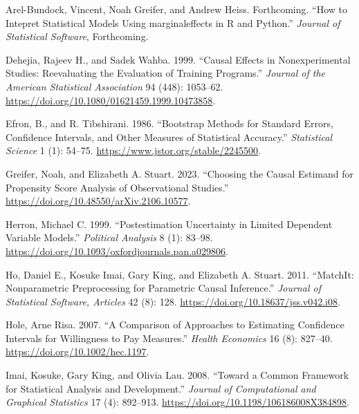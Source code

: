 \hypertarget{refs}{}
\begin{CSLReferences}{1}{0}
\leavevmode{}%
Arel-Bundock, Vincent, Noah Greifer, and Andrew Heiss. Forthcoming. {``How to Intepret Statistical Models Using {marginaleffects} in {R} and {Python}.''} \emph{Journal of Statistical Software}, Forthcoming.

\leavevmode{}%
Dehejia, Rajeev H., and Sadek Wahba. 1999. {``Causal Effects in Nonexperimental Studies: Reevaluating the Evaluation of Training Programs.''} \emph{Journal of the American Statistical Association} 94 (448): 1053--62. \url{https://doi.org/10.1080/01621459.1999.10473858}.

\leavevmode{}%
Efron, B., and R. Tibshirani. 1986. {``Bootstrap Methods for Standard Errors, Confidence Intervals, and Other Measures of Statistical Accuracy.''} \emph{Statistical Science} 1 (1): 54--75. \url{https://www.jstor.org/stable/2245500}.

\leavevmode{}%
Greifer, Noah, and Elizabeth A. Stuart. 2023. {``Choosing the Causal Estimand for Propensity Score Analysis of Observational Studies.''} \url{https://doi.org/10.48550/arXiv.2106.10577}.

\leavevmode{}%
Herron, Michael C. 1999. {``Postestimation Uncertainty in Limited Dependent Variable Models.''} \emph{Political Analysis} 8 (1): 83--98. \url{https://doi.org/10.1093/oxfordjournals.pan.a029806}.

\leavevmode{}%
Ho, Daniel E., Kosuke Imai, Gary King, and Elizabeth A. Stuart. 2011. {``MatchIt: Nonparametric Preprocessing for Parametric Causal Inference.''} \emph{Journal of Statistical Software, Articles} 42 (8): 128. \url{https://doi.org/10.18637/jss.v042.i08}.

\leavevmode{}%
Hole, Arne Risa. 2007. {``A Comparison of Approaches to Estimating Confidence Intervals for Willingness to Pay Measures.''} \emph{Health Economics} 16 (8): 827--40. \url{https://doi.org/10.1002/hec.1197}.

\leavevmode{}%
Imai, Kosuke, Gary King, and Olivia Lau. 2008. {``Toward a Common Framework for Statistical Analysis and Development.''} \emph{Journal of Computational and Graphical Statistics} 17 (4): 892--913. \url{https://doi.org/10.1198/106186008X384898}.


\end{CSLReferences}
